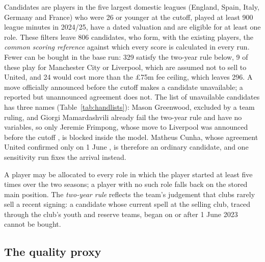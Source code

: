 Candidates are players in the five largest domestic leagues (England, Spain, Italy, Germany and France) who were 26 or younger at the cutoff, played at least 900 league minutes in 2024/25, have a dated valuation and are eligible for at least one role. These filters leave 806 candidates, who form, with the existing players, the \emph{common scoring reference} against which every score is calculated in every run. Fewer can be bought in the base run: 329 satisfy the two-year rule below, 9 of these play for Manchester City or Liverpool, which are assumed not to sell to United, and 24 would cost more than the \pounds 75m fee ceiling, which leaves 296. A move officially announced before the cutoff makes a candidate unavailable; a reported but unannounced agreement does not. The list of unavailable candidates has three names (Table~\ref{tab:handlists}): Mason Greenwood, excluded by a team ruling, and Giorgi Mamardashvili already fail the two-year rule and have no variables, so only Jeremie Frimpong, whose move to Liverpool was announced before the cutoff \citep{bein2025frimpong}, is blocked inside the model. Matheus Cunha, whose agreement United confirmed only on 1 June \citep{irishtimes2025cunha}, is therefore an ordinary candidate, and one sensitivity run fixes the arrival instead.

A player may be allocated to every role in which the player started at least five times over the two seasons; a player with no such role falls back on the stored main position. The \emph{two-year rule} reflects the team's judgement that clubs rarely sell a recent signing: a candidate whose current spell at the selling club, traced through the club's youth and reserve teams, began on or after 1 June 2023 cannot be bought.

\subsection{The quality proxy}


